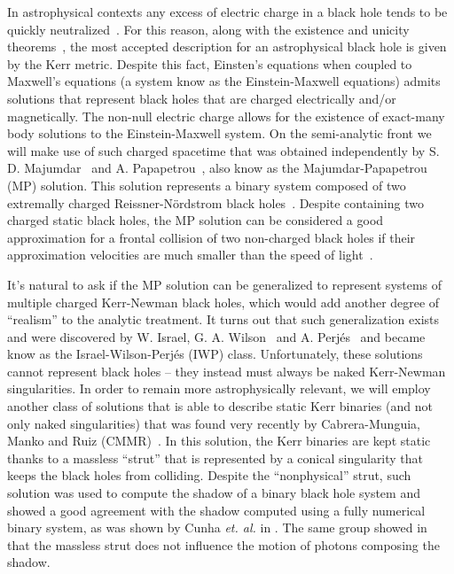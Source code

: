 In astrophysical contexts any excess of electric charge in a black hole tends to be quickly neutralized~\cite{gibbons1975}. For this reason, along with the existence and unicity theorems~\cite{Chrusciel2012,PhysRevLett.114.151102}, the most accepted description for an astrophysical black hole is given by the Kerr metric. Despite this fact, Einsten's equations when coupled to Maxwell's equations (a system know as the Einstein-Maxwell equations) admits solutions that represent black holes that are charged electrically and/or magnetically. The non-null electric charge allows for the existence of exact-many body solutions to the Einstein-Maxwell system. On the semi-analytic front we will make use of such charged spacetime that was obtained independently by S. D. Majumdar~\cite{MAJUMDAR1947} and A. Papapetrou~\cite{PAPAPETROU1947}, also know as the Majumdar-Papapetrou (MP) solution. This solution represents a binary system composed of two extremally charged Reissner-N\"ordstrom black holes~\cite{HARTLE1972}. Despite containing two charged static black holes, the MP solution can be considered a good approximation for a frontal collision of two non-charged black holes if their approximation velocities are much smaller than the speed of light~\cite{BINI2019}.

It's natural to ask if the MP solution can be generalized to represent systems of multiple charged Kerr-Newman black holes, which would add another degree of ``realism'' to the analytic treatment. It turns out that such generalization exists and were discovered by W. Israel, G. A. Wilson~\cite{ISRAEL1972} and A. Perj\'es~\cite{PERJES1971} and became know as the Israel-Wilson-Perj\'es (IWP) class. Unfortunately, these solutions cannot represent black holes -- they instead must always be naked Kerr-Newman singularities. In order to remain more astrophysically relevant, we will employ another class of solutions that is able to describe static Kerr binaries (and not only naked singularities) that was found very recently by Cabrera-Munguia, Manko and Ruiz (CMMR)~\cite{CABRERA2018,MANKO2019,MANKO2020}. In this solution, the Kerr binaries are kept static thanks to a massless ``strut'' that is represented by a conical singularity that keeps the black holes from colliding. Despite the ``nonphysical'' strut, such solution was used to compute the shadow of a binary black hole system and showed a good agreement with the shadow computed using a fully numerical binary system, as was shown by Cunha \emph{et. al.} in \cite{Cunha_2018}. The same group showed in \cite{Cunha_2018_2} that the massless strut does not influence the motion of photons composing the shadow.

